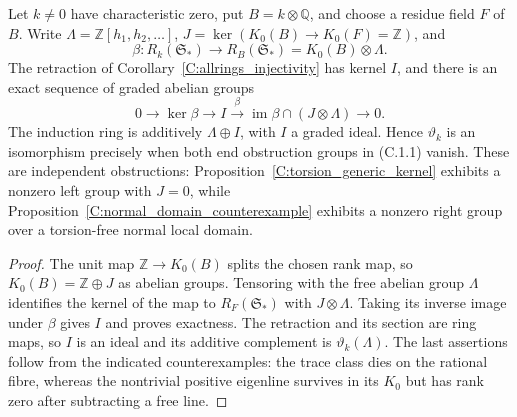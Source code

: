 \begin{proposition}
\label{C:allrings_obstructions}
Let $k\ne0$ have characteristic zero, put $B=k\otimes\mathbb Q$, and
choose a residue field $F$ of $B$. Write $\Lambda=\mathbb Z[h_1,h_2,\ldots]$,
$J=\ker(K_0(B)\to K_0(F)=\mathbb Z)$, and
\[
 \beta:R_k(\mathfrak S_*)\longrightarrow
       R_B(\mathfrak S_*)=K_0(B)\otimes\Lambda.
\]
The retraction of Corollary~\ref{C:allrings_injectivity} has kernel $I$,
and there is an exact sequence of graded abelian groups
\[
 0\longrightarrow\ker\beta\longrightarrow I
   \xrightarrow{\beta}
      \operatorname{im}\beta\cap(J\otimes\Lambda)
   \longrightarrow0.                                  \tag{C.1.1}
\]
The induction ring is additively $\Lambda\oplus I$, with $I$ a graded
ideal. Hence $\vartheta_k$ is an isomorphism precisely when both end
obstruction groups in (C.1.1) vanish. These are independent obstructions:
Proposition~\ref{C:torsion_generic_kernel} exhibits a nonzero left group
with $J=0$, while Proposition~\ref{C:normal_domain_counterexample}
exhibits a nonzero right group over a torsion-free normal local domain.
\end{proposition}
\begin{proof}
The unit map $\mathbb Z\to K_0(B)$ splits the chosen rank map, so
$K_0(B)=\mathbb Z\oplus J$ as abelian groups. Tensoring with the free
abelian group $\Lambda$ identifies the kernel of the map to
$R_F(\mathfrak S_*)$ with $J\otimes\Lambda$. Taking its inverse image
under $\beta$ gives $I$ and proves exactness. The retraction and its
section are ring maps, so $I$ is an ideal and its additive complement
is $\vartheta_k(\Lambda)$. The last assertions follow from the indicated
counterexamples: the trace class dies on the rational fibre, whereas
the nontrivial positive eigenline survives in its $K_0$ but has rank
zero after subtracting a free line.
\end{proof}





